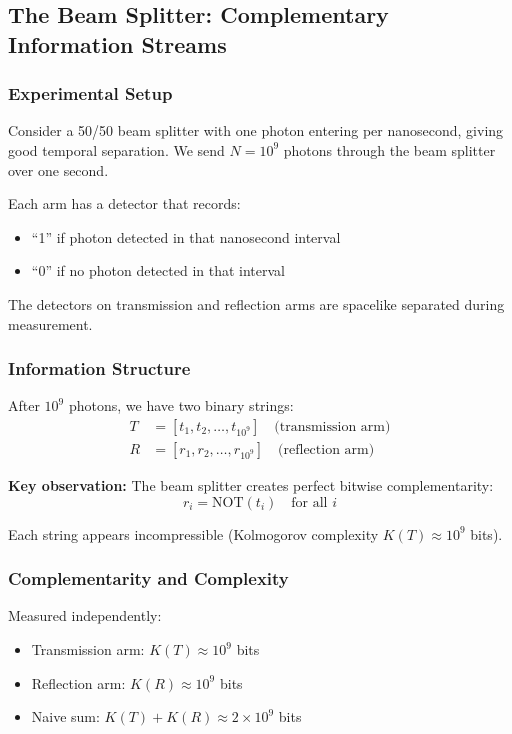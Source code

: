﻿\documentclass[12pt]{article}
\begin{document}
\subsection{The Beam Splitter: Complementary Information Streams}


\subsubsection{Experimental Setup}


Consider a 50/50 beam splitter with one photon entering per nanosecond, 
giving good temporal separation. We send $N = 10^9$ photons through the 
beam splitter over one second.


Each arm has a detector that records:
\begin{itemize}
    \item ``1'' if photon detected in that nanosecond interval
    \item ``0'' if no photon detected in that interval  
\end{itemize}


The detectors on transmission and reflection arms are spacelike separated 
during measurement.


\subsubsection{Information Structure}


After $10^9$ photons, we have two binary strings:
\begin{align}
    T &= [t_1, t_2, \ldots, t_{10^9}] \quad \text{(transmission arm)} \\
    R &= [r_1, r_2, \ldots, r_{10^9}] \quad \text{(reflection arm)}
\end{align}


\textbf{Key observation:} The beam splitter creates perfect bitwise complementarity:
\begin{equation}
    r_i = \text{NOT}(t_i) \quad \text{for all } i
\end{equation}


Each string appears incompressible (Kolmogorov complexity $K(T) \approx 10^9$ bits).


\subsubsection{Complementarity and Complexity}


Measured independently:
\begin{itemize}
    \item Transmission arm: $K(T) \approx 10^9$ bits
    \item Reflection arm: $K(R) \approx 10^9$ bits  
    \item Naive sum: $K(T) + K(R) \approx 2 \times 10^9$ bits
\end{itemize}
\end{document}
